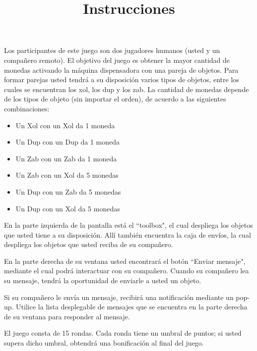\documentclass{article}
\title{Instrucciones}
\author{}
\date{}
\begin{document}
\thispagestyle{empty}

\begin{multicols}{2}{
\noindent Los participantes de este juego son dos jugadores humanos (usted y un compañero remoto). El objetivo del juego es obtener la mayor cantidad de monedas activando la máquina dispensadora con una pareja de objetos. Para formar parejas usted tendrá a su disposición varios tipos de objetos, entre los cuales se encuentran los xol, los dup y los zab. La cantidad de monedas depende de los tipos de objeto (sin importar el orden), de acuerdo a las siguientes combinaciones:
%
\begin{itemize}
\item Un Xol con un Xol da 1 moneda
\item Un Dup con un Dup da 1 moneda
\item Un Zab con un Zab da 1 moneda
\item Un Zab con un Xol da 5 monedas
\item Un Dup con un Zab da 5 monedas
\item Un Dup con un Xol da 5 monedas
\end{itemize}
%
En la parte izquierda de la pantalla está el ``toolbox", el cual despliega los objetos que usted tiene a su disposición. Allí también encuentra la caja de envíos, la cual despliega los objetos que usted reciba de su compañero.

\vspace{0.5\baselineskip}

\noindent En la parte derecha de su ventana usted encontrará el botón ``Enviar mensaje", mediante el cual podrá interactuar con su compañero. Cuando su compañero lea su mensaje, tendrá la oportunidad de enviarle a usted un objeto.

\vspace{0.5\baselineskip}

\noindent Si su compañero le envía un mensaje, recibirá una notificación mediante un pop-up. Utilice la lista desplegable de mensajes que se encuentra en la parte derecha de su ventana para responder al mensaje.

\vspace{0.5\baselineskip}

\noindent El juego consta de 15 rondas. Cada ronda tiene un umbral de puntos; si usted supera dicho umbral, obtendrá una bonificación al final del juego.
}\end{multicols}

\
\end{document}
